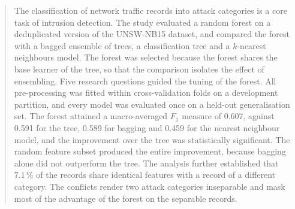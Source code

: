 \begin{abstract}
The classification of network traffic records into attack categories is a
core task of intrusion detection. The study evaluated a random forest on a
deduplicated version of the UNSW-NB15 dataset, and compared the forest with
a bagged ensemble of trees, a classification tree and a $k$-nearest
neighbours model. The forest was selected because the forest shares the base
learner of the tree, so that the comparison isolates the effect of
ensembling. Five research questions guided the tuning of the forest. All
pre-processing was fitted within cross-validation folds on a development
partition, and every model was evaluated once on a held-out generalisation
set. The forest attained a macro-averaged $F_1$ measure of 0.607, against
0.591 for the tree, 0.589 for bagging and 0.459 for the nearest neighbour
model, and the improvement over the tree was statistically significant. The
random feature subset produced the entire improvement, because bagging alone
did not outperform the tree. The analysis further established that
$7.1\,\%$ of the records share identical features with a record of a
different category. The conflicts render two attack categories inseparable
and mask most of the advantage of the forest on the separable records.
\end{abstract}
